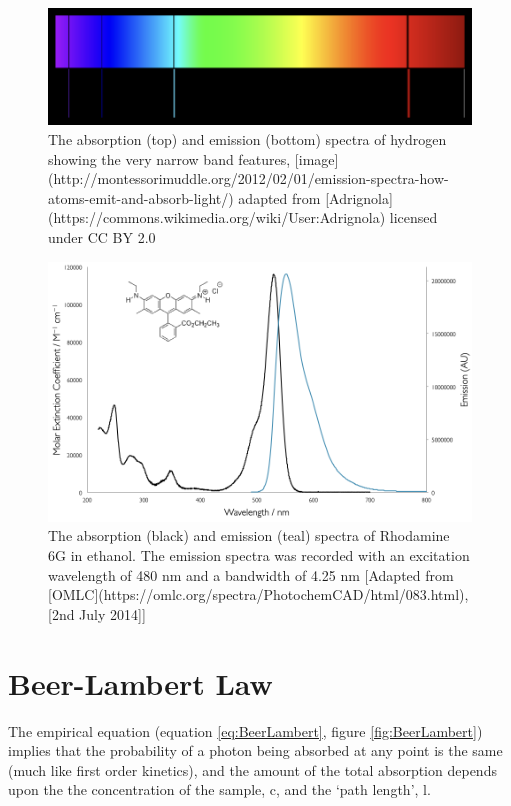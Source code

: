 \documentclass[
]{book}
\begin{document}
\begin{figure}

{\centering \includegraphics[width=0.7\linewidth]{images/HAbsEm} 

}

\caption{The absorption (top) and emission (bottom) spectra of hydrogen showing the very narrow band features, [image](http://montessorimuddle.org/2012/02/01/emission-spectra-how-atoms-emit-and-absorb-light/) adapted from [Adrignola](https://commons.wikimedia.org/wiki/User:Adrignola) licensed under CC BY 2.0}\label{fig:HAbsEm}
\end{figure}

\begin{figure}

{\centering \includegraphics[width=0.6\linewidth]{images/Rhodamine6GAbsEm} 

}

\caption{The absorption (black) and emission (teal) spectra of Rhodamine 6G in ethanol. The emission spectra was recorded with an excitation wavelength of 480 nm and a bandwidth of 4.25 nm [Adapted from [OMLC](https://omlc.org/spectra/PhotochemCAD/html/083.html), [2nd July 2014]]}\label{fig:RhoAbsEm}
\end{figure}

\hypertarget{sec:BeerLambert}{%
\section{Beer-Lambert Law}\label{sec:BeerLambert}}

The empirical equation (equation \eqref{eq:BeerLambert}, figure \ref{fig:BeerLambert}) implies that the probability of a photon being absorbed at any point is the same (much like first order kinetics), and the amount of the total absorption depends upon the the concentration of the sample, c, and the `path length', l.
\end{document}
